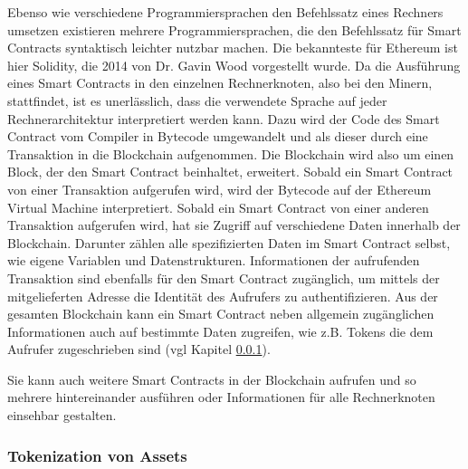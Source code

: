 Ebenso wie verschiedene Programmiersprachen den Befehlssatz eines Rechners umsetzen
existieren mehrere Programmiersprachen, die den Befehlssatz für Smart Contracts
syntaktisch leichter nutzbar machen. Die bekannteste für Ethereum ist hier Solidity,
die 2014 von Dr. Gavin Wood vorgestellt wurde. Da die Ausführung eines Smart Contracts
in den einzelnen Rechnerknoten, also bei den Minern, stattfindet, ist es unerlässlich, 
dass die verwendete Sprache auf jeder Rechnerarchitektur interpretiert werden kann.
Dazu wird der Code des Smart Contract vom Compiler in 
Bytecode umgewandelt und als dieser durch eine Transaktion in die Blockchain 
aufgenommen. %
Die Blockchain wird also um einen Block, der den Smart Contract beinhaltet, erweitert.
Sobald ein Smart Contract von einer Transaktion aufgerufen wird, wird der Bytecode 
auf der Ethereum Virtual Machine interpretiert.
Sobald ein Smart Contract von einer anderen Transaktion aufgerufen wird, hat sie 
Zugriff auf verschiedene Daten innerhalb der Blockchain. 
Darunter zählen alle spezifizierten Daten im Smart Contract selbst, wie eigene Variablen
und Datenstrukturen. Informationen der aufrufenden Transaktion sind ebenfalls für den
Smart Contract zugänglich, um mittels der mitgelieferten Adresse die Identität des Aufrufers
zu authentifizieren. Aus der gesamten Blockchain kann ein Smart Contract neben
allgemein zugänglichen Informationen auch auf bestimmte Daten zugreifen, wie z.B. 
Tokens die dem Aufrufer zugeschrieben sind (vgl Kapitel \ref{sec:Tokenization}).

Sie kann auch weitere Smart Contracts in der Blockchain aufrufen und so mehrere hintereinander 
ausführen oder Informationen für alle Rechnerknoten einsehbar gestalten.

\cite[p.~57ff]{fill2020blockchain}





\subsubsection{Tokenization von Assets}
\label{sec:Tokenization}





